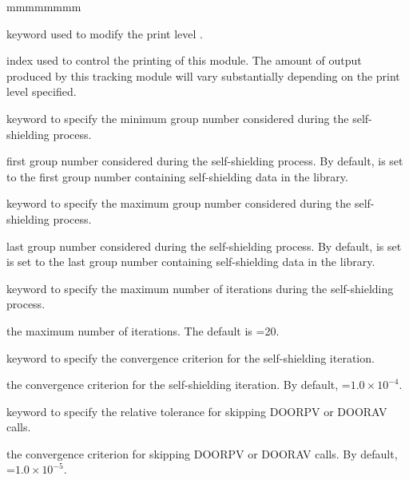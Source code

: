 \begin{ListeDeDescription}{mmmmmmmm}

\item[\moc{EDIT}] keyword used to modify the print level .

\item[\dusa{iprint}] index used to control the printing of this module. The
amount of output produced by this tracking module will vary substantially
depending on the print level specified. 

\item[\moc{GRMIN}] keyword to specify the minimum group number considered
during the self-shielding process.

\item[\dusa{lgrmin}] first group number considered during the
self-shielding process. By default,  is set to the first group
number containing self-shielding data in the library.

\item[\moc{GRMAX}]  keyword to specify the maximum group number considered
during the self-shielding process.

\item[\dusa{lgrmax}] last group number considered during the self-shielding
process. By default,  is set is set to the last group
number containing self-shielding data in the library.

\item[\moc{MXIT}]  keyword to specify the maximum number of iterations during
the self-shielding process.

\item[\dusa{imxit}] the maximum number of iterations. The default is
=20.

\item[\moc{EPS}] keyword to specify the convergence criterion for the
self-shielding iteration.

\item[\dusa{valeps}] the convergence criterion for the self-shielding iteration.
By default, =$1.0\times 10^{-4}$.

\item[\moc{TCEPS}] keyword to specify the relative tolerance for skipping DOORPV or
DOORAV calls.

\item[\dusa{vtceps}] the convergence criterion for skipping DOORPV or
DOORAV calls. By default, =$1.0\times 10^{-5}$.


\end{ListeDeDescription}
